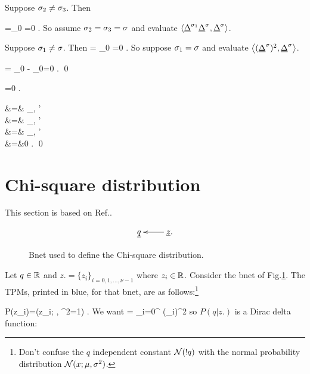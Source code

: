 Suppose $\sigma_2\neq\sigma_3$.
Then

\beq
{}
=_{0}
=0
\;.
\eeq
So assume $\sigma_2=\sigma_3=\sigma$
and evaluate
$\av{\rvDel^{\s_1}\rvDel^{\s}, \rvDel^{\s}}$.

Suppose $\sigma_1\neq \sigma$. Then
\beq
{}=
_{0}
\av{\rvDel^{\s}, \rvDel^{\s}}=0
\;.
\eeq
So suppose $\sigma_1=\sigma$ and evaluate
$\av{(\rvDel^{\s})^2, \rvDel^{\s}}$.

\beq
{}=
_0
-
\underbrace{\av{\rvDel^\s}}_0=0
\;.
\eeq
\qed

\begin{claim}
\beq
{}=0
\;.
\eeq
\end{claim}
\proof
\beqa
{}
&=&
\sum_{\s, \s'}
\\
&=&
\sum_{\s, \s'}
\\
&=&
\sum_{\s, \s'}
\\
&=&0\;\;\;\; 
\;.
\eeqa
\qed

\section{Chi-square distribution}
This section
is based on Ref.\cite{wiki-chi-sq}.

\begin{figure}[h!]
$$
\xymatrix{
\rvq&\rvz.\ar[l]
}
$$
\caption{Bnet
used to define the Chi-square distribution.}
\label{fig-chi-sq}
\end{figure}

Let $q\in{ \mathbb{R}}$ and
$z.=\{z_i\}_{i=0,1, \ldots, \nu-1}$
where $z_i\in { \mathbb{R}}$.
Consider the bnet of Fig.\ref{fig-chi-sq}.
The TPMs, printed in blue,
for that bnet, are as follows:\footnote{
Don't confuse the $q$
independent constant ${\cal N}(!q)$
with the normal probability distribution
${\cal N}(x;\mu, \sigma^2)$.}




\beq
\color{blue}
P(z_i)=\caln(z_i; , \s^2=1)
\;.
\eeq
We want
\beq
\rvq = \sum_{i=0}^{} (\rvz_i)^2
\eeq
so $P(q|z.)$
is a Dirac delta function:

